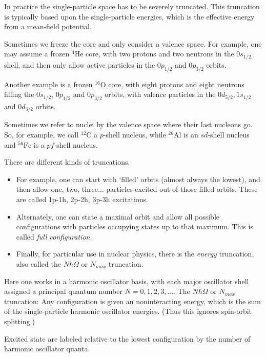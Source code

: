 \documentclass[%
twoside,                 %
final,                   %
10pt]{article}
\begin{document}
 In practice the single-particle space has to be severely truncated.  This truncation is 
typically based upon the single-particle energies, which is the effective energy 
from a mean-field potential. 

Sometimes we freeze the core and only consider a valence space. For example, one 
may assume a frozen ${}^{4}\mbox{He}$ core, with two protons and two neutrons in the $0s_{1/2}$ 
shell, and then only allow active particles in the $0p_{1/2}$ and $0p_{3/2}$ orbits. 


Another example is a frozen ${}^{16}\mbox{O}$ core, with eight protons and eight neutrons filling the 
$0s_{1/2}$,  $0p_{1/2}$ and $0p_{3/2}$ orbits, with valence particles in the 
$0d_{5/2}, 1s_{1/2}$ and $0d_{3/2}$ orbits.


Sometimes we refer to nuclei by the valence space where their last nucleons go.  
So, for example, we call ${}^{12}\mbox{C}$ a $p$-shell nucleus, while ${}^{26}\mbox{Al}$ is an 
$sd$-shell nucleus and ${}^{56}\mbox{Fe}$ is a $pf$-shell nucleus.





There are different kinds of truncations.

\begin{itemize}
\item For example, one can start with `filled' orbits (almost always the lowest), and then  allow one, two, three... particles excited out of those filled orbits. These are called  1p-1h, 2p-2h, 3p-3h excitations. 

\item Alternately, one can state a maximal orbit and allow all possible configurations with  particles occupying states up to that maximum. This is called \emph{full configuration}.

\item Finally, for particular use in nuclear physics, there is the \emph{energy} truncation, also  called the $N\hbar\Omega$ or $N_{max}$ truncation. 
\end{itemize}

\noindent
Here one works in a harmonic oscillator basis, with each major oscillator shell assigned  a principal quantum number $N=0,1,2,3,...$. 
The $N\hbar\Omega$ or $N_{max}$ truncation: Any configuration is given an noninteracting energy, which is the sum 
of the single-particle harmonic oscillator energies. (Thus this ignores 
spin-orbit splitting.)

Excited state are labeled relative to the lowest configuration by the 
number of harmonic oscillator quanta.
\end{document}
